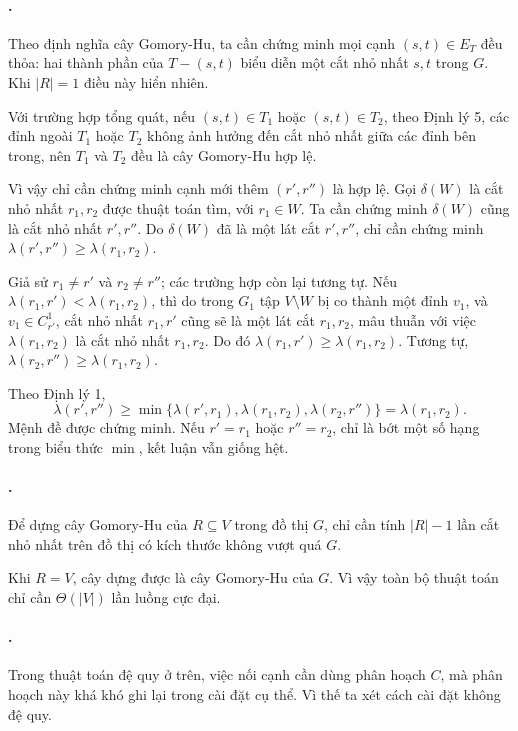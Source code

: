 \documentclass[11pt]{article}
\begin{document}
\paragraph{.}
Theo định nghĩa cây Gomory-Hu, ta cần chứng minh mọi cạnh
\((s,t)\in E_T\) đều thỏa: hai thành phần của \(T-(s,t)\) biểu diễn một cắt
nhỏ nhất \(s,t\) trong \(G\). Khi \(|R|=1\) điều này hiển nhiên.

Với trường hợp tổng quát, nếu \((s,t)\in T_1\) hoặc \((s,t)\in T_2\), theo
Định lý 5, các đỉnh ngoài \(T_1\) hoặc \(T_2\) không ảnh hưởng đến cắt nhỏ
nhất giữa các đỉnh bên trong, nên \(T_1\) và \(T_2\) đều là cây Gomory-Hu hợp
lệ.

Vì vậy chỉ cần chứng minh cạnh mới thêm \((r',r'')\) là hợp lệ. Gọi
\(\delta(W)\) là cắt nhỏ nhất \(r_1,r_2\) được thuật toán tìm, với
\(r_1\in W\). Ta cần chứng minh \(\delta(W)\) cũng là cắt nhỏ nhất
\(r',r''\). Do \(\delta(W)\) đã là một lát cắt \(r',r''\), chỉ cần chứng minh
\(\lambda(r',r'')\ge \lambda(r_1,r_2)\).

Giả sử \(r_1\ne r'\) và \(r_2\ne r''\); các trường hợp còn lại tương tự. Nếu
\(\lambda(r_1,r')<\lambda(r_1,r_2)\), thì do trong \(G_1\) tập
\(V\setminus W\) bị co thành một đỉnh \(v_1\), và \(v_1\in C^1_{r'}\), cắt
nhỏ nhất \(r_1,r'\) cũng sẽ là một lát cắt \(r_1,r_2\), mâu thuẫn với việc
\(\lambda(r_1,r_2)\) là cắt nhỏ nhất \(r_1,r_2\). Do đó
\(\lambda(r_1,r')\ge \lambda(r_1,r_2)\). Tương tự,
\(\lambda(r_2,r'')\ge \lambda(r_1,r_2)\).

Theo Định lý 1,
\[
  \lambda(r',r'')
  \ge \min\{\lambda(r',r_1),\lambda(r_1,r_2),\lambda(r_2,r'')\}
  = \lambda(r_1,r_2).
\]
Mệnh đề được chứng minh. Nếu \(r'=r_1\) hoặc \(r''=r_2\), chỉ là bớt một số
hạng trong biểu thức \(\min\), kết luận vẫn giống hệt.

\paragraph{.}
Để dựng cây Gomory-Hu của \(R\subseteq V\) trong đồ thị \(G\), chỉ cần tính
\(|R|-1\) lần cắt nhỏ nhất trên đồ thị có kích thước không vượt quá \(G\).

Khi \(R=V\), cây dựng được là cây Gomory-Hu của \(G\). Vì vậy toàn bộ thuật
toán chỉ cần \(\Theta(|V|)\) lần luồng cực đại.

\paragraph{.}
Trong thuật toán đệ quy ở trên, việc nối cạnh cần dùng phân hoạch \(C\), mà
phân hoạch này khá khó ghi lại trong cài đặt cụ thể. Vì thế ta xét cách cài
đặt không đệ quy.
\end{document}
